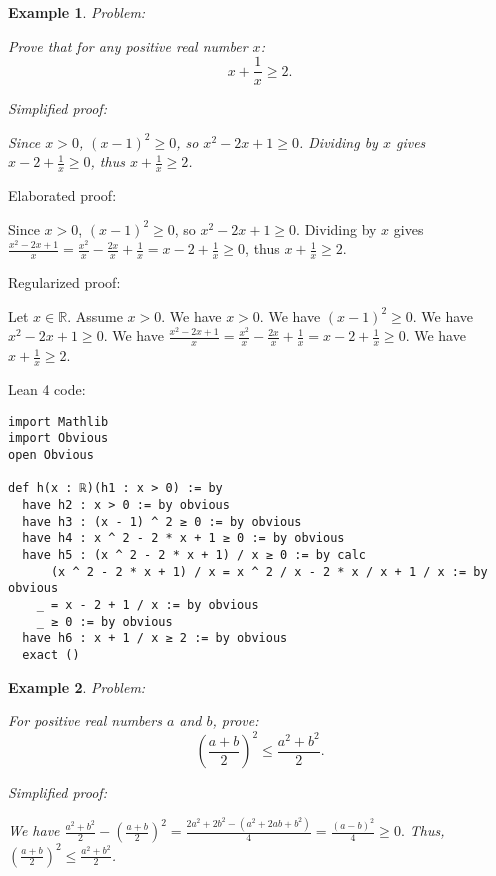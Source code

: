 \documentclass{article}
\newtheorem{example}{Example}
\begin{document}
\begin{example}
Problem:
\begin{tcolorbox}[colback=yellow!10, width=\linewidth]
Prove that for any positive real number $x$:
    $$x + \frac{1}{x} \geq 2.$$
\end{tcolorbox}

Simplified proof:
\begin{tcolorbox}[colback=blue!10, width=\linewidth]
Since $x>0$, $(x-1)^2 \ge 0$, so $x^2 - 2x + 1 \ge 0$. Dividing by $x$ gives $x - 2 + \frac{1}{x} \ge 0$, thus $x + \frac{1}{x} \ge 2$.
\end{tcolorbox}
\end{example}

Elaborated proof:
\begin{tcolorbox}[colback=green!10, width=\linewidth]
Since $x>0$, $(x-1)^2 \ge 0$, so $x^2 - 2x + 1 \ge 0$. Dividing by $x$ gives $\frac{x^2 - 2x + 1}{x} = \frac{x^2}{x} - \frac{2x}{x} + \frac{1}{x} = x - 2 + \frac{1}{x} \ge 0$, thus $x + \frac{1}{x} \ge 2$.
\end{tcolorbox}

Regularized proof:
\begin{tcolorbox}[colback=red!10, width=\linewidth]
Let $x\in\mathbb{R}$. Assume $x > 0$.
We have $x > 0$. We have ${(x-1)}^2 \ge 0$. We have $x^2 - 2x + 1 \ge 0$. We have $\frac{x^2 - 2x + 1}{x} = \frac{x^2}{x} - \frac{2x}{x} + \frac{1}{x} = x - 2 + \frac{1}{x} \ge 0$. We have $x + \frac{1}{x} \ge 2$.
\end{tcolorbox}

Lean 4 code:
\begin{tcolorbox}[colback=white!10, width=\linewidth]
\begin{lstlisting}[language=Lean4]
import Mathlib
import Obvious
open Obvious

def h(x : ℝ)(h1 : x > 0) := by
  have h2 : x > 0 := by obvious
  have h3 : (x - 1) ^ 2 ≥ 0 := by obvious
  have h4 : x ^ 2 - 2 * x + 1 ≥ 0 := by obvious
  have h5 : (x ^ 2 - 2 * x + 1) / x ≥ 0 := by calc
      (x ^ 2 - 2 * x + 1) / x = x ^ 2 / x - 2 * x / x + 1 / x := by obvious
    _ = x - 2 + 1 / x := by obvious
    _ ≥ 0 := by obvious
  have h6 : x + 1 / x ≥ 2 := by obvious
  exact ()

\end{lstlisting}
\end{tcolorbox}


\begin{example}
Problem:
\begin{tcolorbox}[colback=yellow!10, width=\linewidth]
For positive real numbers $a$ and $b$, prove:
    $$\left(\frac{a+b}{2}\right)^2 \leq \frac{a^2+b^2}{2}.$$
\end{tcolorbox}

Simplified proof:
\begin{tcolorbox}[colback=blue!10, width=\linewidth]
We have
$ \frac{a^2+b^2}{2} - \left(\frac{a+b}{2}\right)^2 = \frac{2a^2+2b^2-(a^2+2ab+b^2)}{4} = \frac{(a-b)^2}{4} \ge 0. $
Thus, $\left(\frac{a+b}{2}\right)^2 \leq \frac{a^2+b^2}{2}$.
\end{tcolorbox}
\end{example}
\end{document}
